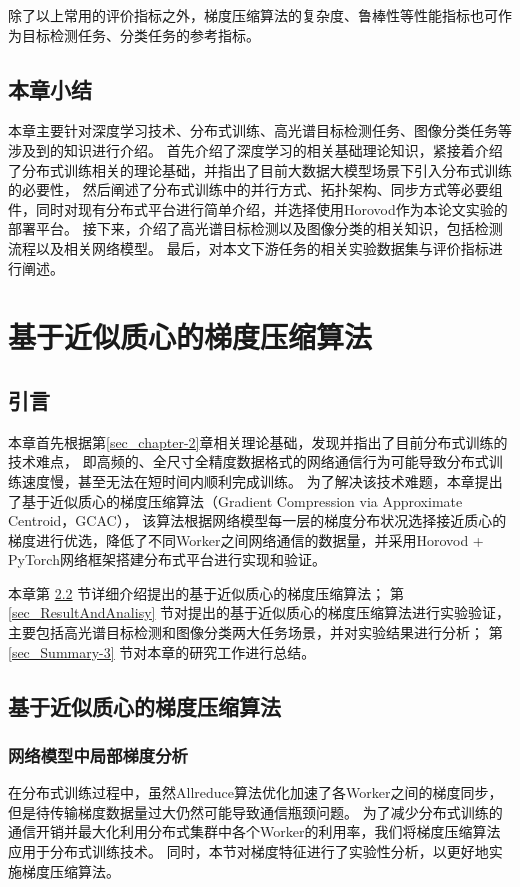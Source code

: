 \documentclass{xdupgthesis}
\begin{document}
除了以上常用的评价指标之外，梯度压缩算法的复杂度、鲁棒性等性能指标也可作为目标检测任务、分类任务的参考指标。

\section{本章小结}
本章主要针对深度学习技术、分布式训练、高光谱目标检测任务、图像分类任务等涉及到的知识进行介绍。
首先介绍了深度学习的相关基础理论知识，紧接着介绍了分布式训练相关的理论基础，并指出了目前大数据大模型场景下引入分布式训练的必要性，
然后阐述了分布式训练中的并行方式、拓扑架构、同步方式等必要组件，同时对现有分布式平台进行简单介绍，并选择使用Horovod作为本论文实验的部署平台。
接下来，介绍了高光谱目标检测以及图像分类的相关知识，包括检测流程以及相关网络模型。
最后，对本文下游任务的相关实验数据集与评价指标进行阐述。


\chapter{基于近似质心的梯度压缩算法}
\label{sec_chapter-3}
\section{引言}
本章首先根据第\ref{sec_chapter-2}章相关理论基础，发现并指出了目前分布式训练的技术难点，
即高频的、全尺寸全精度数据格式的网络通信行为可能导致分布式训练速度慢，甚至无法在短时间内顺利完成训练。
为了解决该技术难题，本章提出了基于近似质心的梯度压缩算法（Gradient Compression via Approximate Centroid，GCAC），
该算法根据网络模型每一层的梯度分布状况选择接近质心的梯度进行优选，降低了不同Worker之间网络通信的数据量，并采用Horovod + PyTorch网络框架搭建分布式平台进行实现和验证。

本章第 \ref{sec_GCC} 节详细介绍提出的基于近似质心的梯度压缩算法；
第 \ref{sec_ResultAndAnalisy} 节对提出的基于近似质心的梯度压缩算法进行实验验证，主要包括高光谱目标检测和图像分类两大任务场景，并对实验结果进行分析；
第 \ref{sec_Summary-3} 节对本章的研究工作进行总结。

\section{基于近似质心的梯度压缩算法}
\label{sec_GCC}
\subsection{网络模型中局部梯度分析}
\label{sec_LocalGradient}
在分布式训练过程中，虽然Allreduce算法优化加速了各Worker之间的梯度同步，但是待传输梯度数据量过大仍然可能导致通信瓶颈问题。
为了减少分布式训练的通信开销并最大化利用分布式集群中各个Worker的利用率，我们将梯度压缩算法应用于分布式训练技术。
同时，本节对梯度特征进行了实验性分析，以更好地实施梯度压缩算法。
\end{document}
